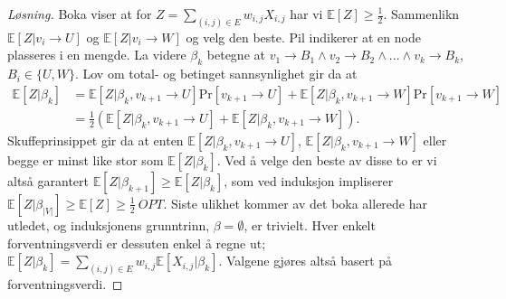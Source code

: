 \documentclass[12pt]{article}
\newenvironment{solution}{\begin{proof}[Løsning]}{\end{proof}}
\begin{document}
\begin{solution}
Boka viser at for $Z = \sum_{(i, j) \in E} w_{i,j} X_{i, j}$ har vi $\mathbb{E}[Z] \geq \frac{1}{2}$. Sammenlikn $\mathbb{E}[Z | v_i \rightarrow U]$ og $\mathbb{E}[Z | v_i \rightarrow W]$ og velg den beste. Pil indikerer at en node plasseres i en mengde. La videre $\beta_k$ betegne at $v_1 \rightarrow B_1 \wedge v_2 \rightarrow B_2 \wedge ... \wedge v_k \rightarrow B_k$, $B_i \in \{U, W\}$. Lov om total- og betinget sannsynlighet gir da at
\begin{align}
\mathbb{E}[Z|\beta_k] &= \mathbb{E}[Z|\beta_k, v_{k+1} \rightarrow U] \textrm{Pr} \left [ v_{k+1} \rightarrow U \right] + \mathbb{E}[Z|\beta_k, v_{k+1} \rightarrow W] \textrm{Pr} \left [ v_{k+1} \rightarrow W \right] \\
&= \frac{1}{2} \left( \mathbb{E}[Z|\beta_k, v_{k+1} \rightarrow U] + \mathbb{E}[Z|\beta_k, v_{k+1} \rightarrow W] \right).
\end{align}
Skuffeprinsippet gir da at enten $\mathbb{E}[Z|\beta_k, v_{k+1} \rightarrow U]$, $\mathbb{E}[Z|\beta_k, v_{k+1} \rightarrow W]$ eller begge er minst like stor som $\mathbb{E}[Z|\beta_k]$. Ved å velge den beste av disse to er vi altså garantert $\mathbb{E}[Z|\beta_{k+1}] \geq \mathbb{E}[Z|\beta_k]$, som ved induksjon impliserer $\mathbb{E}[Z|\beta_{|V|}] \geq \mathbb{E}[Z] \geq \frac{1}{2}~OPT$. Siste ulikhet kommer av det boka allerede har utledet, og induksjonens grunntrinn, $\beta = \emptyset$, er trivielt. Hver enkelt forventningsverdi er dessuten enkel å regne ut; $ \mathbb{E}[Z|\beta_k] = \sum_{(i,j) \in E} w_{i, j} \mathbb{E}[X_{i,j}|\beta_k]$. Valgene gjøres altså basert på forventningsverdi.


\end{solution}
\end{document}
